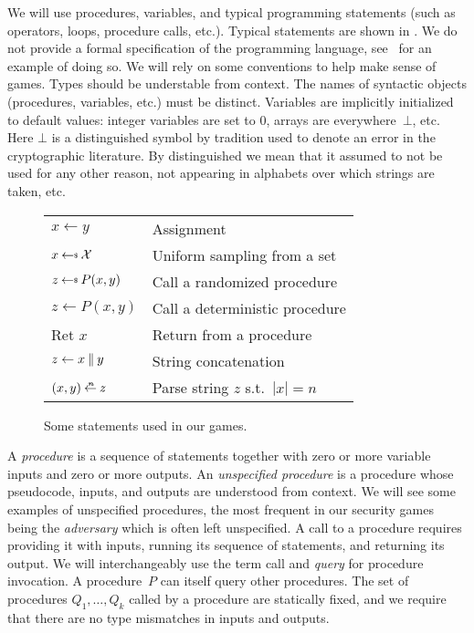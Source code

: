 We will use procedures, variables, and typical
programming statements (such as operators, loops, procedure calls, etc.).
Typical statements are shown in .
We do not provide a formal specification of the programming language,
see~\cite[Appendix B]{bellare2006security} for an example of doing so. 
We will rely on some conventions to help make sense of games.
Types should be understable
from context. The names of syntactic objects (procedures, variables, etc.)
must be distinct.  Variables are implicitly 
initialized to default values:  integer variables are set
to 0, arrays are everywhere~$\bot$, etc. Here $\bot$ is a distinguished symbol
by tradition used to denote an error in the cryptographic literature.
By distinguished we mean that it assumed to not be used for any other reason,
not appearing in alphabets over which strings are taken, etc.


\begin{wrapfigure}{r}{3in}
\gamesfontsize
\begin{tabular}{lp{2in}}
\toprule
$x \gets y$ & Assignment\\
$x \getsr \calX$ & Uniform sampling from a set\\
$z \getsr P(x,y)$ & Call a randomized procedure\\
$z \gets P(x,y)$ & Call a deterministic procedure\\
Ret $x$ & Return from a procedure\\
$z \gets x \: \| \: y$ & String concatenation\\
$(x,y) \getparse{n} z$ & Parse string $z$ s.t.~$|x| = n$\\
\bottomrule
\end{tabular}
\caption{Some statements used in our games.}
\label{fig:statements}
\end{wrapfigure}


A \textit{procedure} is a sequence of statements together 
with zero or more variable inputs and zero or more 
outputs. %
An \emph{unspecified procedure} is a procedure whose pseudocode, inputs, and
outputs are understood from context.  We will see some examples of
unspecified procedures, the most frequent in our security games being the 
\emph{adversary} which is often left unspecified. 
%
%
A call to a procedure requires providing it with inputs, running its sequence of
statements, and returning its output. We will interchangeably use the term call
and \emph{query} for procedure invocation.
A procedure~$P$ can itself query other
procedures. The set of procedures $Q_1,\ldots,Q_k$ called by a procedure are
statically fixed, and we require that there are no type mismatches in inputs and
outputs. 

